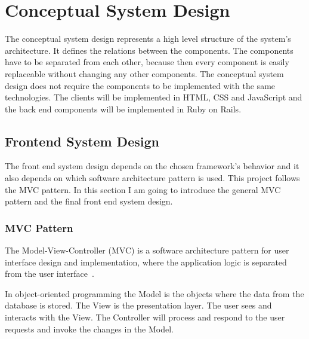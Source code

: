 \chapter{Conceptual System Design}\label{conceptual}
The conceptual system design represents a high level structure of the system's architecture. It defines the relations between the components. The components have to be separated from each other, because then every component is easily replaceable without changing any other components. The conceptual system design does not require the components to be implemented with the same technologies. The clients will be implemented in HTML, CSS and JavaScript  and the back end components will be implemented in Ruby on Rails.


\section{Frontend System Design}
\label{frontend-system-design}
The front end system design depends on the chosen framework's behavior and it also depends on which software architecture pattern is used. This project follows the MVC pattern. In this section I am going to introduce the general MVC pattern and the final front end system design. 

\subsection{MVC Pattern}
\label{mvc}

The Model-View-Controller (MVC) is a software architecture pattern for user interface design and implementation, where the application logic is separated from the user interface~\cite{szofttech}.

In object-oriented programming the Model is the objects where the data from the database is stored. The View is the presentation layer. The user sees and interacts with the View. The Controller will process and respond to the user requests and invoke the changes in the Model. 



